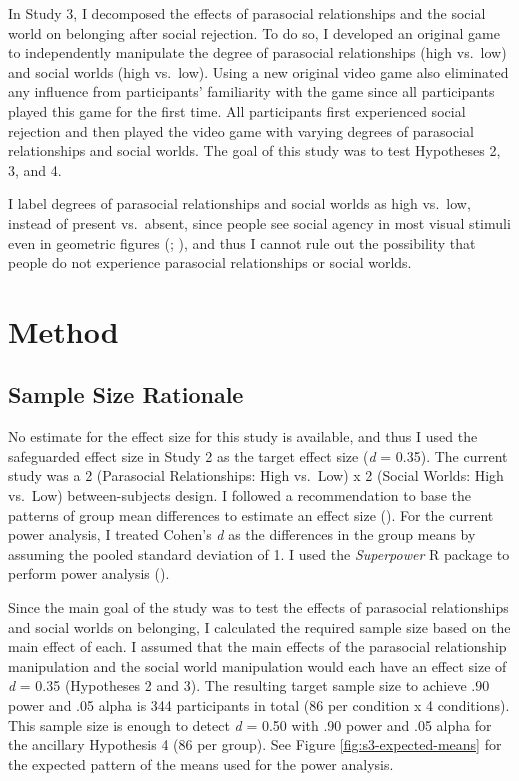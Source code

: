 \documentclass[
]{udthesis}
\begin{document}
In Study 3, I decomposed the effects of parasocial relationships and the
social world on belonging after social rejection. To do so, I developed
an original game to independently manipulate the degree of parasocial
relationships (high vs.~low) and social worlds (high vs.~low). Using a
new original video game also eliminated any influence from participants'
familiarity with the game since all participants played this game for
the first time. All participants first experienced social rejection and
then played the video game with varying degrees of parasocial
relationships and social worlds. The goal of this study was to test
Hypotheses 2, 3, and 4.

I label degrees of parasocial relationships and social worlds as high
vs.~low, instead of present vs.~absent, since people see social agency
in most visual stimuli even in geometric figures
(; ), and thus I cannot rule out the
possibility that people do not experience parasocial relationships or
social worlds.

\section{Method}\label{method-1}

\subsection{Sample Size Rationale}\label{sample-size-rationale-1}

No estimate for the effect size for this study is available, and thus I
used the safeguarded effect size in Study 2 as the target effect size
(\emph{d} = 0.35). The current study was a 2 (Parasocial Relationships: High
vs.~Low) x 2 (Social Worlds: High vs.~Low) between-subjects design. I
followed a recommendation to base the patterns of group mean differences
to estimate an effect size
(). For the current
power analysis, I treated Cohen's \emph{d} as the differences in the group
means by assuming the pooled standard deviation of 1. I used the
\emph{Superpower} R package to perform power analysis
().

Since the main goal of the study was to test the effects of parasocial
relationships and social worlds on belonging, I calculated the required
sample size based on the main effect of each. I assumed that the main
effects of the parasocial relationship manipulation and the social world
manipulation would each have an effect size of \emph{d} = 0.35 (Hypotheses 2
and 3). The resulting target sample size to achieve .90 power and .05
alpha is 344 participants in total (86 per condition x 4 conditions).
This sample size is enough to detect \emph{d} = 0.50 with .90 power and .05
alpha for the ancillary Hypothesis 4 (86 per group). See Figure
\ref{fig:s3-expected-means} for the expected pattern of the means used
for the power analysis.
\end{document}

